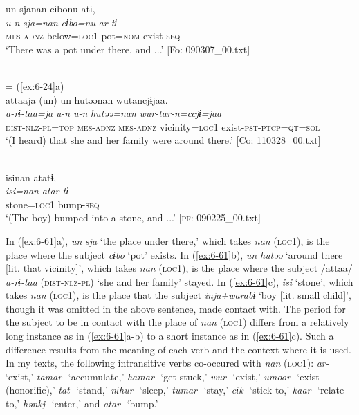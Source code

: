 \ea\label{ex:6-61}
\ea
{\TM}
\glll un  sjanan  cɨbonu  atɨ,\\
\textit{u-n}  \textit{sja=nan}  \textit{cɨbo=nu}  \textit{ar-tɨ}\\
\textsc{mes}-\textsc{adnz}  below=\textsc{loc1}  pot=\textsc{nom}  exist-\textsc{seq}\\
\glt ‘There was a pot under there, and ...’ [Fo: 090307\_00.txt]

\ex{}\\
= (\ref{ex:6-24}a)\\

{\TM}
\glll attaaja  (un)  un  hutəənan   wutancjɨjaa.\\
      \textit{a-rɨ-taa=ja}  \textit{u-n}  \textit{u-n}  \textit{hutəə=nan} \textit{wur-tar-n=ccjɨ=jaa}\\
      \textsc{dist}-\textsc{nlz}-\textsc{pl}=\textsc{top}  \textsc{mes}-\textsc{adnz}  \textsc{mes}-\textsc{adnz}  vicinity=\textsc{loc1}      exist-\textsc{pst}-\textsc{ptcp}=\textsc{qt}=\textsc{sol}\\
\glt ‘(I heard) that she and her family were around there.’ [Co: 110328\_00.txt]

\ex{}\\
{\TM}
\glll  isinan  atatɨ,\\
\textit{isi=nan}  \textit{atar-tɨ}\\
stone=\textsc{loc1}  bump-\textsc{seq}\\
\glt ‘(The boy) bumped into a stone, and ...’ [\textsc{pf}: 090225\_00.txt]
\z
\z

In (\ref{ex:6-61}a), \textit{un} \textit{sja} ‘the place under there,’ which takes \textit{nan} (\textsc{loc1}), is the place where the subject \textit{cɨbo} ‘pot’ exists. In (\ref{ex:6-61}b), \textit{un} \textit{hutəə} ‘around there [lit. that vicinity]’, which takes \textit{nan} (\textsc{loc1}), is the place where the subject /attaa/ \textit{a-rɨ-taa} (\textsc{dist}-\textsc{nlz}-\textsc{pl}) ‘she and her family’ stayed. In (\ref{ex:6-61}c), \textit{isi} ‘stone’, which takes \textit{nan} (\textsc{loc1}), is the place that the subject \textit{inja+warabɨ} ‘boy [lit. small child]’, though it was omitted in the above sentence, made contact with. The period for the subject to be in contact with the place of \textit{nan} (\textsc{loc1}) differs from a relatively long instance as in (\ref{ex:6-61}a-b) to a short instance as in (\ref{ex:6-61}c). Such a difference results from the meaning of each verb and the context where it is used. In my texts, the following intransitive verbs co-occured with \textit{nan} (\textsc{loc1}): \textit{ar-} ‘exist,’ \textit{tamar-} ‘accumulate,’ \textit{hamar-} ‘get stuck,’ \textit{wur-} ‘exist,’ \textit{umoor-} ‘exist (honorific),’ \textit{tat-} ‘stand,’ \textit{nɨhur-} ‘sleep,’ \textit{tumar-} ‘stay,’ \textit{cɨk-} ‘stick to,’ \textit{kaar-} ‘relate to,’ \textit{hənkj-} ‘enter,’ and \textit{atar-} ‘bump.’

